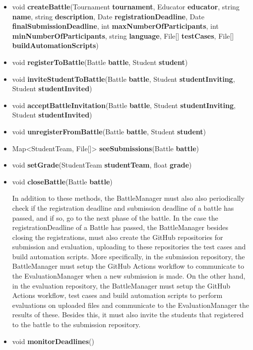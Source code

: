 \documentclass{article}
\begin{document}
\begin{itemize}
    \item void \textbf{createBattle}(Tournament \textbf{tournament}, Educator \textbf{educator}, string \textbf{name}, 
    string \textbf{description}, Date \textbf{registrationDeadline}, Date \textbf{finalSubmissionDeadline},
    int \textbf{maxNumberOfParticipants}, int \textbf{minNumberOfParticipants}, 
    string \textbf{language}, File[] \textbf{testCases}, File[] \textbf{buildAutomationScripts})
    \item void \textbf{registerToBattle}(Battle \textbf{battle}, Student \textbf{student})
    \item void \textbf{inviteStudentToBattle}(Battle \textbf{battle}, Student \textbf{studentInviting}, Student \textbf{studentInvited})
    \item void \textbf{acceptBattleInvitation}(Battle \textbf{battle}, Student \textbf{studentInviting}, Student \textbf{studentInvited})
    \item void \textbf{unregisterFromBattle}(Battle \textbf{battle}, Student \textbf{student})
    \item Map<StudentTeam, File[]> \textbf{seeSubmissions}(Battle \textbf{battle})
    \item void \textbf{setGrade}(StudentTeam \textbf{studentTeam}, float \textbf{grade})
    \item void \textbf{closeBattle}(Battle \textbf{battle})

    In addition to these methods, the BattleManager must also also periodically check if the registration deadline and submission deadline of a battle has passed, and if so, go to the next phase of the battle.
    In the case the registrationDeadline of a Battle has passed, the BattleManager besides closing the registrations, must also create the GitHub repositories for submission and evaluation, uploading to these 
    repositories the test cases and build automation scripts. More specifically, in the submission repository, the BattleManager must setup the GitHub Actions workflow to communicate to the EvaluationManager when a new submission is made.
    On the other hand, in the evaluation repository, the BattleManager must setup the GitHub Actions workflow, test cases and build automation scripts to perform evaluations on uploaded files and communicate to the EvaluationManager the results of these. 
    Besides this, it must also invite the students that registered to the battle to the submission repository.
    \item void \textbf{monitorDeadlines}()
\end{itemize}
\end{document}
